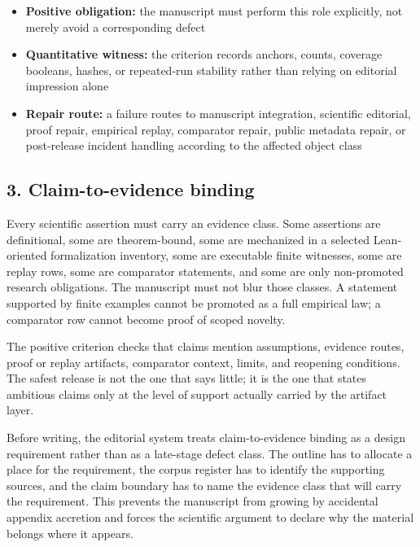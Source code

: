 \begin{itemize}[leftmargin=1.8em]

\item \textbf{Positive obligation:} the manuscript must perform this role explicitly, not merely avoid a corresponding defect

\item \textbf{Quantitative witness:} the criterion records anchors, counts, coverage booleans, hashes, or repeated-run stability rather than relying on editorial impression alone

\item \textbf{Repair route:} a failure routes to manuscript integration, scientific editorial, proof repair, empirical replay, comparator repair, public metadata repair, or post-release incident handling according to the affected object class

\end{itemize}

\subsection{3. Claim-to-evidence binding}

Every scientific assertion must carry an evidence class. Some assertions are definitional, some are theorem-bound, some are mechanized in a selected Lean-oriented formalization inventory, some are executable finite witnesses, some are replay rows, some are comparator statements, and some are only non-promoted research obligations. The manuscript must not blur those classes. A statement supported by finite examples cannot be promoted as a full empirical law; a comparator row cannot become proof of scoped novelty.


The positive criterion checks that claims mention assumptions, evidence routes, proof or replay artifacts, comparator context, limits, and reopening conditions. The safest release is not the one that says little; it is the one that states ambitious claims only at the level of support actually carried by the artifact layer.


Before writing, the editorial system treats claim-to-evidence binding as a design requirement rather than as a late-stage defect class. The outline has to allocate a place for the requirement, the corpus register has to identify the supporting sources, and the claim boundary has to name the evidence class that will carry the requirement. This prevents the manuscript from growing by accidental appendix accretion and forces the scientific argument to declare why the material belongs where it appears.


